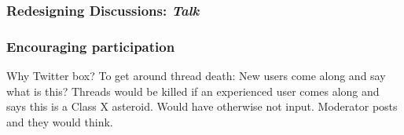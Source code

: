 \documentclass{sigchi}
\begin{document}
\subsubsection{Redesigning Discussions: \emph{Talk}}


	


\subsubsection{Encouraging participation}



Why Twitter box?  To get around thread death: New users come along and say what is this? Threads would be killed if an experienced user comes along and says this is a Class X asteroid. Would have otherwise not input. Moderator posts and they would think. %





\end{document}
